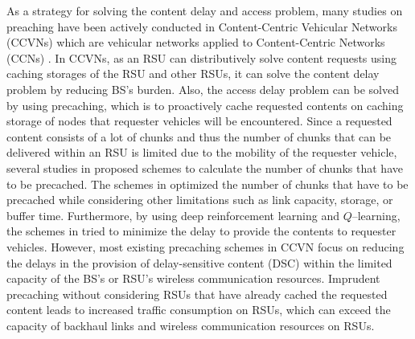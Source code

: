 \documentclass{ieeeaccess}
\begin{document}
As a strategy for solving the content delay and access problem, many studies \cite{Park2019, Ahani2018, AlNagar2019, Liang2018, Hou2019} on preaching have been actively conducted in Content-Centric Vehicular Networks (CCVNs) which are vehicular networks applied to  Content-Centric Networks (CCNs) \cite{Jacobson2009, zhang2014}.
In CCVNs, as an RSU can distributively solve content requests using caching storages of the RSU and other RSUs, it can solve the content delay problem by reducing BS's burden.
Also, the access delay problem can be solved by using precaching, which is to proactively cache requested contents on caching storage of nodes that requester vehicles will be encountered.
Since a requested content consists of a lot of chunks and thus the number of chunks that can be delivered within an RSU is limited due to the mobility of the requester vehicle, several studies in \cite{Zhe2020, Khelifi2018, Park2019} proposed schemes to calculate the number of chunks that have to be precached.
The schemes in \cite{Ahani2018, AlNagar2019, Liang2018} optimized the number of chunks that have to be precached while considering other limitations such as link capacity, storage, or buffer time.
Furthermore, by using deep reinforcement learning and $Q$--learning, the schemes in \cite{Hou2019, Zhu2019} tried to minimize the delay to provide the contents to requester vehicles.
However, most existing precaching schemes in CCVN focus on reducing the delays in the provision of delay-sensitive content (DSC) within the limited capacity of the BS's or RSU's wireless communication resources.
Imprudent precaching without considering RSUs that have already cached the requested content leads to increased traffic consumption on RSUs, which can exceed the capacity of backhaul links and wireless communication resources on RSUs.
\end{document}
